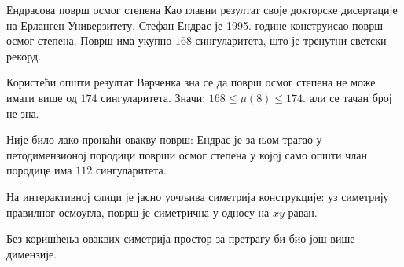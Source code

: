 \begin{surferPage}{Ендрасова површ осмог степена}
    Као главни резултат своје докторске дисертације на Ерланген Универзитету, 
	Стефан Ендрас је 1995. године конструисао површ осмог степена.
    Површ има укупно $168$ сингуларитета, што је тренутни светски рекорд. 
  
    Користећи општи резултат Варченка зна се да површ осмог степена не може имати 
    више од  $174$ сингуларитета.
    Значи: $168 \le \mu(8) \le 174$. 
    али се тачан број не зна.

    Није било лако пронаћи овакву површ: Ендрас је за њом трагао у петодимензионој 
    породици површи осмог степена у којој само општи члан породице има 
    $112$ сингуларитета.

    На интерактивној слици је јасно уочљива симетрија конструкције: 
    уз симетрију правилног осмоугла, површ је симетрична у односу на $xy$ раван.

    Без коришћења оваквих симетрија простор за претрагу би био још више димензије.
\end{surferPage}
